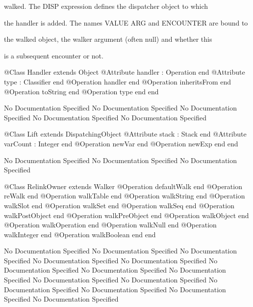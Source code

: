       walked. The DISP expression defines the dispatcher object to which

      the handler is added. The names VALUE ARG and ENCOUNTER are bound to

      the walked object, the walker argument (often null) and whether this

      is a subsequent encounter or not.
\begin{Interface}
@Class Handler extends Object
  @Attribute handler : Operation end
  @Attribute type : Classifier end
  @Operation handler end
  @Operation inheritsFrom end
  @Operation toString end
  @Operation type end
end
\end{Interface}
No Documentation Specified
No Documentation Specified
No Documentation Specified
No Documentation Specified
No Documentation Specified
\begin{Interface}
@Class Lift extends DispatchingObject
  @Attribute stack : Stack end
  @Attribute varCount : Integer end
  @Operation newVar end
  @Operation newExp end
end
\end{Interface}
No Documentation Specified
No Documentation Specified
No Documentation Specified
\begin{Interface}
@Class RelinkOwner extends Walker
  @Operation defaultWalk end
  @Operation reWalk end
  @Operation walkTable end
  @Operation walkString end
  @Operation walkSlot end
  @Operation walkSet end
  @Operation walkSeq end
  @Operation walkPostObject end
  @Operation walkPreObject end
  @Operation walkObject end
  @Operation walkOperation end
  @Operation walkNull end
  @Operation walkInteger end
  @Operation walkBoolean end
end
\end{Interface}
No Documentation Specified
No Documentation Specified
No Documentation Specified
No Documentation Specified
No Documentation Specified
No Documentation Specified
No Documentation Specified
No Documentation Specified
No Documentation Specified
No Documentation Specified
No Documentation Specified
No Documentation Specified
No Documentation Specified
No Documentation Specified

